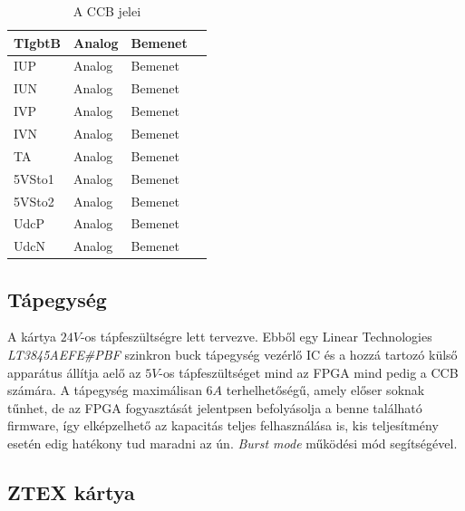 \begin{table}[]
\begin{tabular}{|l|l|l|l|}
TIgbtB         & Analog       & Bemenet      &                                 \\ \hline
IUP            & Analog       & Bemenet      &                                 \\ \hline
IUN            & Analog       & Bemenet      &                                 \\ \hline
IVP            & Analog       & Bemenet      &                                 \\ \hline
IVN            & Analog       & Bemenet      &                                 \\ \hline
TA             & Analog       & Bemenet      &                                 \\ \hline
5VSto1         & Analog       & Bemenet      &                                 \\ \hline
5VSto2         & Analog       & Bemenet      &                                 \\ \hline
UdcP           & Analog       & Bemenet      &                                 \\ \hline
UdcN           & Analog       & Bemenet      &                                 \\ \hline
\end{tabular}
\caption{A CCB jelei}
\label{ccbsignals}
\end{table}


\subsection{Tápegység}
A kártya $24 V$-os tápfeszültségre lett tervezve. Ebből egy Linear Technologies \emph{LT3845AEFE#PBF} szinkron buck tápegység vezérlő IC és a hozzá tartozó külső apparátus állítja aelő az $5 V$-os tápfeszültséget mind az FPGA mind pedig a CCB számára. A tápegység maximálisan $6 A$ terhelhetőségű, amely előser soknak tűnhet, de az FPGA fogyasztását jelentpsen befolyásolja a benne található firmware, így elképzelhető az kapacitás teljes felhasználása is, kis teljesítmény esetén edig hatékony tud maradni az ún. \emph{Burst mode} működési mód segítségével.

\subsection{ZTEX kártya}

